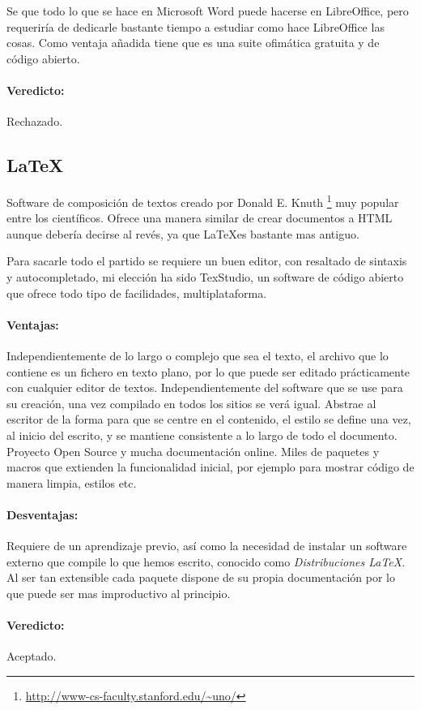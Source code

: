 Se que todo lo que se hace en Microsoft Word puede hacerse en LibreOffice, pero requerir\'{i}a de dedicarle bastante tiempo a estudiar como hace
LibreOffice las cosas. Como ventaja a\~{n}adida tiene que es una suite ofim\'{a}tica gratuita y de c\'{o}digo abierto.

\paragraph{Veredicto:} Rechazado.

\subsection{\LaTeX}
Software de composici\'{o}n de textos creado por Donald E. Knuth \footnote{\url{http://www-cs-faculty.stanford.edu/~uno/}} muy popular entre los
cient\'{i}ficos. Ofrece una manera similar de crear documentos a HTML aunque deber\'{i}a decirse al rev\'{e}s, ya que \LaTeX es bastante mas antiguo.

Para sacarle todo el partido se requiere un buen editor, con resaltado de sintaxis y autocompletado, mi elecci\'{o}n ha sido TexStudio, un
software de c\'{o}digo abierto que ofrece todo tipo de facilidades, multiplataforma.

\paragraph{Ventajas:} Independientemente de lo largo o complejo que sea el texto, el archivo que lo contiene es un fichero en texto plano, por lo que
puede ser editado pr\'{a}cticamente con cualquier editor de textos. Independientemente del software que se use para su creaci\'{o}n, una vez compilado
en todos los sitios se ver\'{a} igual. Abstrae al escritor de la forma para que se centre en el contenido, el estilo se define una vez, al inicio del
escrito, y se mantiene consistente a lo largo de todo el documento. Proyecto Open Source y mucha documentaci\'{o}n online. Miles de paquetes y 
macros que extienden la funcionalidad inicial, por ejemplo para mostrar c\'{o}digo de manera limpia, estilos etc. 

\paragraph{Desventajas:} Requiere de un aprendizaje previo, as\'{i} como la necesidad de instalar un software externo que compile lo que hemos escrito,
conocido como \emph{Distribuciones \LaTeX}. Al ser tan extensible cada paquete dispone de su propia documentaci\'{o}n por lo que puede ser mas improductivo
al principio. 

\paragraph{Veredicto:} Aceptado.
